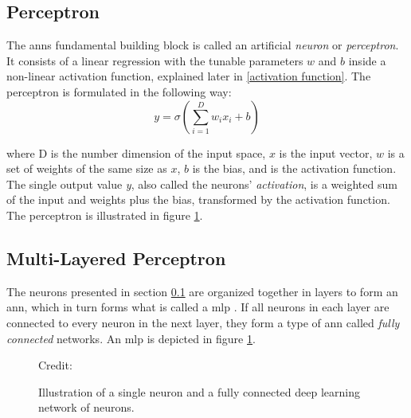     \subsection{Perceptron} \label{perceptron}
        The \gls{ann}s fundamental building block is called an artificial \textit{neuron} or \textit{perceptron}. It consists of a linear regression with the tunable parameters $w$ and $b$ inside a non-linear activation function, explained later in \ref{activation function}. The perceptron is formulated in the following way\cite{razavi2021deep_exp_per}:
            \begin{equation} \label{eq_perceptron}
                y = \sigma(\sum_{i=1}^{D}w_ix_i + b)
            \end{equation}
            
        where D is the number dimension of the input space, $x$ is the input vector, $w$ is a set of weights of the same size as $x$, $b$ is the bias, and {\textsigma} is the activation function. The single output value \textit{y}, also called the neurons' \textit{activation}, is a weighted sum of the input and weights plus the bias, transformed by the activation function. The perceptron is illustrated in figure \ref{Perceptron / MLP}.
    
    \subsection{Multi-Layered Perceptron} \label{MLP}
        The neurons presented in section \ref{perceptron} are organized together in layers to form an \gls{ann}, which in turn forms what is called a \gls{mlp} \cite{razavi2021deep_exp_per}. If all neurons in each layer are connected to every neuron in the next layer, they form a type of \gls{ann} called \textit{fully connected} networks. An \gls{mlp} is depicted in figure \ref{Perceptron / MLP}.
        
            \begin{figure}[H]
                \centering
                
        	
                
                \caption[The perceptron and multi-layer perceptron]{Illustration of a single neuron and a fully connected deep learning network of neurons.}
              	\medskip 
                \hspace*{15pt}\hbox{\scriptsize Credit: \citeauthor{razavi2021deep_exp_per}\cite{razavi2021deep_exp_per}}
                \label{Perceptron / MLP}
            \end{figure}
        
